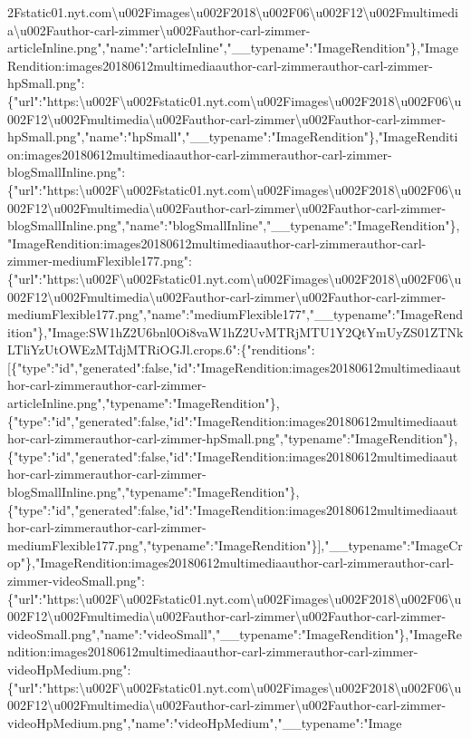 2Fstatic01.nyt.com\textbackslash{}u002Fimages\textbackslash{}u002F2018\textbackslash{}u002F06\textbackslash{}u002F12\textbackslash{}u002Fmultimedia\textbackslash{}u002Fauthor-carl-zimmer\textbackslash{}u002Fauthor-carl-zimmer-articleInline.png","name":"articleInline","\_\_typename":"ImageRendition"\},"ImageRendition:images20180612multimediaauthor-carl-zimmerauthor-carl-zimmer-hpSmall.png":\{"url":"https:\textbackslash{}u002F\textbackslash{}u002Fstatic01.nyt.com\textbackslash{}u002Fimages\textbackslash{}u002F2018\textbackslash{}u002F06\textbackslash{}u002F12\textbackslash{}u002Fmultimedia\textbackslash{}u002Fauthor-carl-zimmer\textbackslash{}u002Fauthor-carl-zimmer-hpSmall.png","name":"hpSmall","\_\_typename":"ImageRendition"\},"ImageRendition:images20180612multimediaauthor-carl-zimmerauthor-carl-zimmer-blogSmallInline.png":\{"url":"https:\textbackslash{}u002F\textbackslash{}u002Fstatic01.nyt.com\textbackslash{}u002Fimages\textbackslash{}u002F2018\textbackslash{}u002F06\textbackslash{}u002F12\textbackslash{}u002Fmultimedia\textbackslash{}u002Fauthor-carl-zimmer\textbackslash{}u002Fauthor-carl-zimmer-blogSmallInline.png","name":"blogSmallInline","\_\_typename":"ImageRendition"\},"ImageRendition:images20180612multimediaauthor-carl-zimmerauthor-carl-zimmer-mediumFlexible177.png":\{"url":"https:\textbackslash{}u002F\textbackslash{}u002Fstatic01.nyt.com\textbackslash{}u002Fimages\textbackslash{}u002F2018\textbackslash{}u002F06\textbackslash{}u002F12\textbackslash{}u002Fmultimedia\textbackslash{}u002Fauthor-carl-zimmer\textbackslash{}u002Fauthor-carl-zimmer-mediumFlexible177.png","name":"mediumFlexible177","\_\_typename":"ImageRendition"\},"Image:SW1hZ2U6bnl0Oi8vaW1hZ2UvMTRjMTU1Y2QtYmUyZS01ZTNkLTliYzUtOWEzMTdjMTRiOGJl.crops.6":\{"renditions":{[}\{"type":"id","generated":false,"id":"ImageRendition:images20180612multimediaauthor-carl-zimmerauthor-carl-zimmer-articleInline.png","typename":"ImageRendition"\},\{"type":"id","generated":false,"id":"ImageRendition:images20180612multimediaauthor-carl-zimmerauthor-carl-zimmer-hpSmall.png","typename":"ImageRendition"\},\{"type":"id","generated":false,"id":"ImageRendition:images20180612multimediaauthor-carl-zimmerauthor-carl-zimmer-blogSmallInline.png","typename":"ImageRendition"\},\{"type":"id","generated":false,"id":"ImageRendition:images20180612multimediaauthor-carl-zimmerauthor-carl-zimmer-mediumFlexible177.png","typename":"ImageRendition"\}{]},"\_\_typename":"ImageCrop"\},"ImageRendition:images20180612multimediaauthor-carl-zimmerauthor-carl-zimmer-videoSmall.png":\{"url":"https:\textbackslash{}u002F\textbackslash{}u002Fstatic01.nyt.com\textbackslash{}u002Fimages\textbackslash{}u002F2018\textbackslash{}u002F06\textbackslash{}u002F12\textbackslash{}u002Fmultimedia\textbackslash{}u002Fauthor-carl-zimmer\textbackslash{}u002Fauthor-carl-zimmer-videoSmall.png","name":"videoSmall","\_\_typename":"ImageRendition"\},"ImageRendition:images20180612multimediaauthor-carl-zimmerauthor-carl-zimmer-videoHpMedium.png":\{"url":"https:\textbackslash{}u002F\textbackslash{}u002Fstatic01.nyt.com\textbackslash{}u002Fimages\textbackslash{}u002F2018\textbackslash{}u002F06\textbackslash{}u002F12\textbackslash{}u002Fmultimedia\textbackslash{}u002Fauthor-carl-zimmer\textbackslash{}u002Fauthor-carl-zimmer-videoHpMedium.png","name":"videoHpMedium","\_\_typename":"Image